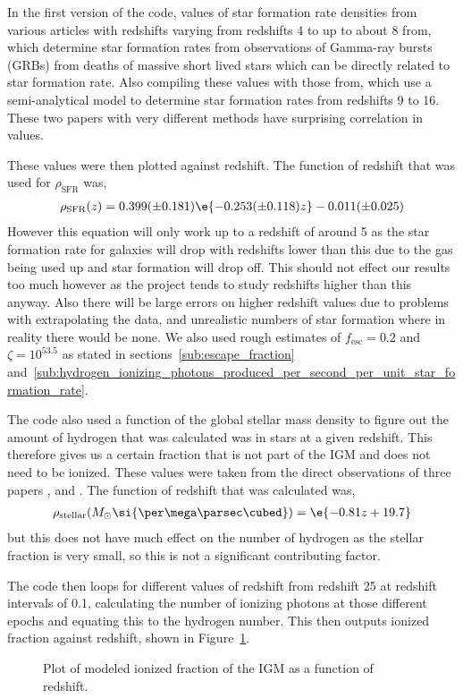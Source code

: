 	In the first version of the code, values of star formation rate densities from  various articles with redshifts varying from redshifts 4 to up to about 8 from\cite{2010MNRAS.401.2561W}, which determine star formation rates from observations of Gamma-ray bursts (GRBs) from deaths of massive short lived stars which can be directly related to star formation rate. Also compiling these values with those from\cite{2012ApJ...759L..38A}, which use a semi-analytical model to determine star formation rates from redshifts 9 to 16. These two papers with very different methods have surprising correlation in values.

	These values were then plotted against redshift. The function of redshift that was used for $\rho_\text{SFR}$ was,
	\begin{align}
		\rho_\text{SFR}(z)=0.399(\pm 0.181)\e{-0.253(\pm 0.118)z}-0.011(\pm 0.025)
	\end{align}
	However this equation will only work up to a redshift of around 5 as the star formation rate for galaxies will drop with redshifts lower than this due to the gas being used up and star formation will drop off. This should not effect our results too much however as the project tends to study redshifts higher than this anyway. Also there will be large errors on higher redshift values due to problems with extrapolating the data, and unrealistic numbers of star formation where in reality there would be none. We also used rough estimates of $f_\text{esc}=0.2$ and $\zeta=10^{53.5}$ as stated in sections~\ref{sub:escape_fraction} and~\ref{sub:hydrogen_ionizing_photons_produced_per_second_per_unit_star_formation_rate}.

	The code also used a function of the global stellar mass density to figure out the amount of hydrogen that was calculated was in stars at a given redshift. This therefore gives us a certain fraction that is not part of the IGM and does not need to be ionized. These values were taken from the direct observations of three papers \cite{2006A&A...459..745F}, \cite{2003A&A...401...73W} and \cite{2003ApJS..149..289B}. The function of redshift that was calculated was,
	\begin{align}
		\rho_\text{stellar}(M_{\odot}\si{\per\mega\parsec\cubed})=\e{-0.81z+19.7}
	\end{align}
	but this does not have much effect on the number of hydrogen as the stellar fraction is very small, so this is not a significant contributing factor.

	The code then loops for different values of redshift from redshift 25 at redshift intervals of 0.1, calculating the number of ionizing photons at those different epochs and equating this to the hydrogen number. This then outputs ionized fraction against redshift, shown in Figure~\ref{fig:IonizedFraction1}.
	\begin{figure}[!htbp]
		\centering
			\begingroup{}
		  		\resizebox{0.7\textwidth}{!}{%
					
		  		}\endgroup
		\caption{Plot of modeled ionized fraction of the IGM as a function of redshift.\label{fig:IonizedFraction1}}
	\end{figure}

